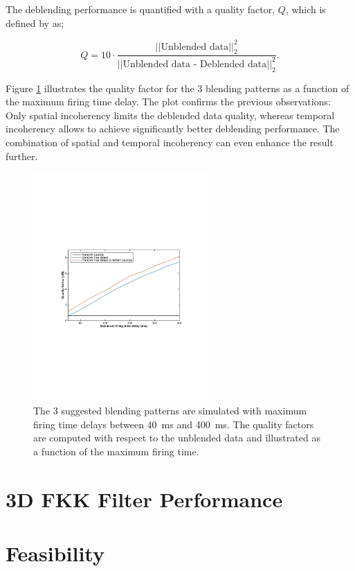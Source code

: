 The deblending performance is quantified with a quality factor, $Q$, which is defined by \citet{IbrahimQuality} as;

\begin{equation}
	Q = 10 \cdot \frac{\left|\left|\text{Unblended data}\right|\right| _2 ^2}{\left|\left|\text{Unblended data - Deblended data}\right|\right| _2 ^2} .	
\end{equation}

Figure \ref{fig:Ch-Results-QualityFactors} illustrates the quality factor for the 3 blending patterns as a function of the maximum firing time delay. The plot confirms the previous observations: Only spatial incoherency limits the deblended data quality, whereas temporal incoherency allows to achieve significantly better deblending performance. The combination of spatial and temporal incoherency can even enhance the result further.

\begin{figure}
	\centering
	\includegraphics[width = 0.6\textwidth]{Plots/BlendingPatterns/quality_line_plot_avg}
	\caption{The 3 suggested blending patterns are simulated with maximum firing time delays between \SI{40}{\milli\second} and \SI{400}{\milli\second}. The quality factors are computed with respect to the unblended data and illustrated as a function of the maximum firing time.}
	\label{fig:Ch-Results-QualityFactors}
\end{figure}

\FloatBarrier
\section{3D FKK Filter Performance}

\section{Feasibility}








